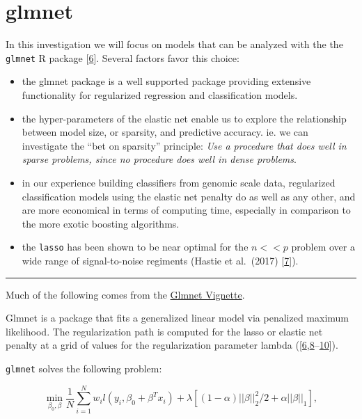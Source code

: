\documentclass[
]{book}
\begin{document}
\hypertarget{glmnet}{%
\section{glmnet}\label{glmnet}}

In this investigation we will focus on models that can be
analyzed with the the \texttt{glmnet} R package {[}\protect\hyperlink{ref-Friedman:2010aa}{6}{]}. Several
factors favor this choice:

\begin{itemize}
\item
  the glmnet package is a well supported package providing
  extensive functionality for regularized regression and classification models.
\item
  the hyper-parameters of the elastic net enable us to explore
  the relationship between model size, or sparsity, and predictive accuracy.
  ie. we can investigate the ``bet on sparsity'' principle:
  \emph{Use a procedure that does well in sparse problems, since no procedure
  does well in dense problems}.
\item
  in our experience building classifiers from genomic scale data, regularized
  classification models using the elastic net penalty do as well as any other,
  and are more economical in terms of computing time, especially in comparison to
  the more exotic boosting algorithms.
\item
  the \texttt{lasso} has been shown to be near optimal for the \(n<<p\) problem
  over a wide range of signal-to-noise regiments (Hastie et al.~(2017) {[}\protect\hyperlink{ref-Hastie:2017aa}{7}{]}).
\end{itemize}

\begin{center}\rule{0.5\linewidth}{0.5pt}\end{center}

Much of the following comes from the
\href{https://web.stanford.edu/~hastie/glmnet/glmnet_alpha.html}{Glmnet Vignette}.

Glmnet is a package that fits a generalized linear model via penalized maximum likelihood.
The regularization path is computed for the lasso or elastic net penalty at a
grid of values for the regularization parameter lambda
({[}\protect\hyperlink{ref-Friedman:2010aa}{6},\protect\hyperlink{ref-Tibshirani:2012aa}{8}--\protect\hyperlink{ref-Simon:2013aa}{10}{]}).

\texttt{glmnet} solves the following problem:

\[\min_{\beta_0,\beta} \frac{1}{N} \sum_{i=1}^{N} w_i l(y_i,\beta_0+\beta^T x_i) + \lambda\left[(1-\alpha)||\beta||_2^2/2 + \alpha ||\beta||_1\right],\]
\end{document}
